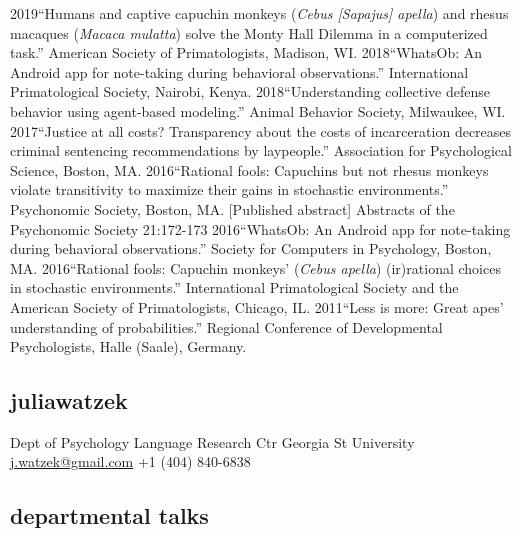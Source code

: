 \documentclass[]{friggeri-cv}
\begin{document}
\begin{entrylist2}
  \entrytwo
    {2019}{``Humans and captive capuchin monkeys (\emph{Cebus [Sapajus] apella}) and rhesus macaques (\emph{Macaca mulatta}) solve the Monty Hall Dilemma in a computerized task.'' American Society of Primatologists, Madison, WI.}
  \entrytwo
    {2018}{``WhatsOb: An Android app for note-taking during behavioral observations.'' International Primatological Society, Nairobi, Kenya.}
  \entrytwo
    {2018}{``Understanding collective defense behavior using agent-based modeling.'' Animal Behavior Society, Milwaukee, WI.}
  \entrytwo
    {2017}{``Justice at all costs? Transparency about the costs of incarceration decreases criminal sentencing recommendations by laypeople.'' Association for Psychological Science, Boston, MA.}
\entrytwo
    {2016}{``Rational fools: Capuchins but not rhesus monkeys violate transitivity to maximize their gains in stochastic environments.'' Psychonomic Society, Boston, MA. [Published abstract] Abstracts of the Psychonomic Society 21:172-173}
  \entrytwo
    {2016}{``WhatsOb: An Android app for note-taking during behavioral observations.'' Society for Computers in Psychology, Boston, MA.}
  \entrytwo
    {2016}{``Rational fools: Capuchin monkeys' (\emph{Cebus apella}) (ir)rational choices in stochastic environments.'' International Primatological Society and the American Society of Primatologists, Chicago, IL.}
  \entrytwo
    {2011}{``Less is more: Great apes' understanding of probabilities.'' Regional Conference of Developmental Psychologists, Halle (Saale), Germany.}
\end{entrylist2}



\begin{aside}
  \section{{\normalfont julia}watzek}
    Dept of Psychology
    Language Research Ctr
    Georgia St University
    ~
    \href{mailto:j.watzek@gmail.com}{j.watzek@gmail.com}
    +1 (404) 840-6838
\end{aside}


\subsection{departmental talks}
\end{document}
